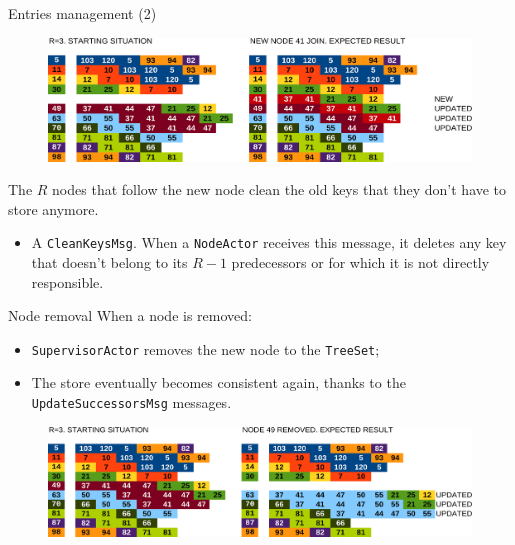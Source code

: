 \documentclass{beamer}
\begin{document}
\begin{frame}{Entries management (2)} \justify

    \begin{figure}
        \includegraphics[width=\linewidth]{01-NodeJoin.png}
    \end{figure}

    The $R$ nodes that follow the new node clean the old keys that they don't have to store anymore. 

    \begin{itemize}[label=$\bullet$]
        \item A \texttt{CleanKeysMsg}. When a \texttt{NodeActor} receives this message, it deletes any key that doesn't belong to its $R-1$ predecessors or for which it is not directly responsible.
    \end{itemize}

\end{frame}

\begin{frame}{Node removal} \justify
    When a node is removed:

    \begin{itemize}[label=$\bullet$]
        \item \texttt{SupervisorActor} removes the new node to the \texttt{TreeSet};
        \item The store eventually becomes consistent again, thanks to the \texttt{UpdateSuccessorsMsg} messages.
    \end{itemize}

    \begin{figure}
        \includegraphics[width=\linewidth]{02-NodeRemoved.png}
    \end{figure}
\end{frame}
\end{document}

